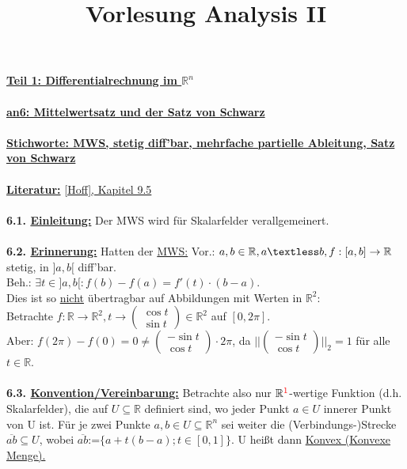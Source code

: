 \documentclass[]{scrartcl}
\title{Vorlesung Analysis II}
\begin{document}
\textbf{\underline{Teil 1: Differentialrechnung im $\mathbb{R}^n$}}\\
\\
\textbf{\underline{an6: Mittelwertsatz und der Satz von Schwarz}}\\
\\
\textbf{\underline{\underline{Stichworte:} MWS, stetig diff'bar, mehrfache 
partielle Ableitung, Satz von Schwarz}}\\
\\
\textbf{\underline{Literatur:}} \ul{[Hoff], Kapitel 9.5}\\
\\
\textbf{6.1. \underline{Einleitung:}} Der MWS wird für Skalarfelder 
verallgemeinert.\\
\\
\textbf{6.2. \underline{Erinnerung:}} Hatten der \ul{MWS:} 
Vor.: $a,b \in \mathbb{R}, a\textless b, f:[a,b]\rightarrow \mathbb{R}$ stetig, 
in $]a,b[$ diff'bar.\\
Beh.: $\exists t\in]a,b[: f(b)-f(a)= f'(t)\cdot(b-a).$\\
Dies ist so \underline{nicht} übertragbar auf Abbildungen mit Werten in 
$\mathbb{R}^2$:\\
Betrachte $f:\mathbb{R}\rightarrow\mathbb{R}^2, t\rightarrow\begin{pmatrix}
	\cos t\\\sin t
\end{pmatrix}\in \mathbb{R}^2$ auf $[0,2\pi]$.\\
Aber: $ f(2\pi)-f(0)=0\neq\begin{pmatrix}
	-\sin t\\\cos t
\end{pmatrix}\cdot 2\pi$, da $||\begin{pmatrix}
	-\sin t\\\cos t
\end{pmatrix}||_2=1$ für alle $t\in\mathbb{R}.$\\
\\
\textbf{6.3. \underline{Konvention/Vereinbarung:}} Betrachte also nur 
\underline{$\mathbb{R}^{\textcolor{red}{1}}$}-wertige Funktion (d.h. 
Skalarfelder), die auf $U\subseteq \mathbb{R}$ definiert sind, wo jeder Punkt 
$a\in U$ innerer Punkt von U ist. Für je zwei Punkte $a,b\in U\subseteq 
\mathbb{R}^n$ sei weiter die (Verbindungs-)Strecke $\overline{ab}\subseteq U$, 
wobei \ul{$\overline{ab}$}:=$\{a+t(b-a);t\in [0,1]\}$. U 
heißt dann \ul{Konvex (Konvexe Menge).}\\
\end{document}
